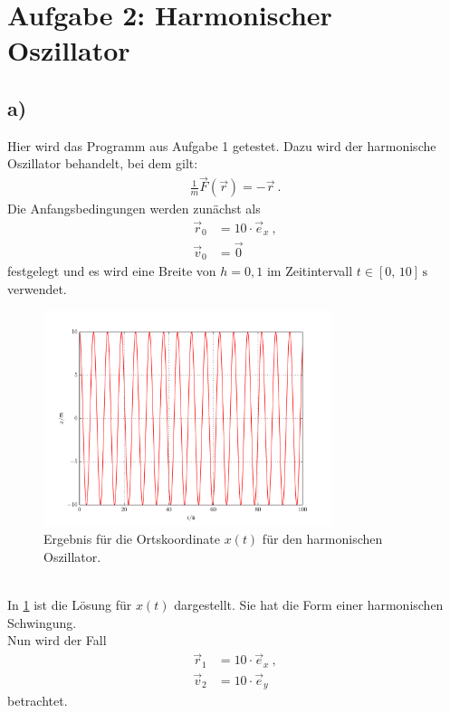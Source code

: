 
\section*{Aufgabe 2: Harmonischer Oszillator}
\subsection*{a)}
Hier wird das Programm aus Aufgabe 1 getestet.
Dazu wird der harmonische Oszillator behandelt, bei dem gilt:
\begin{align}
	\frac{1}{m}\vec{F}(\vec{r})=-\vec{r}~.
\end{align}
Die Anfangsbedingungen werden zunächst als
\begin{align}
	\vec{r}_0&=10\cdot\vec{e}_x~,\\ \vec{v}_0&=\vec{0}
\end{align}
festgelegt und es wird eine Breite von $h=0,1$ im Zeitintervall $t\in[0,\,10]\,\text{s}$ verwendet.\\
\begin{figure}[h!]
	\centering
	\includegraphics[width = 0.75\textwidth]{../Plots/Plot_2_A_1.pdf}
	\caption{Ergebnis für die Ortskoordinate $x(t)$ für den harmonischen Oszillator.\label{fig:Zentral_X}}
\end{figure}\\
In \cref{fig:Zentral_X} ist die Lösung für $x(t)$ dargestellt.
Sie hat die Form einer harmonischen Schwingung.\\
\newpage
Nun wird der Fall
\begin{align}
	\vec{r}_1&=10\cdot\vec{e}_x~,\\ \vec{v}_2&=10\cdot\vec{e}_y
\end{align}
betrachtet.
